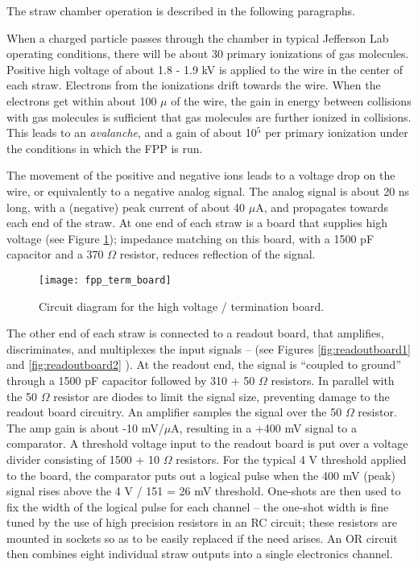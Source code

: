 The straw chamber operation is described in the following paragraphs.

When a charged particle passes through the chamber in typical Jefferson Lab
operating conditions, there will be about 30 primary ionizations of gas
molecules.
Positive high voltage of about 1.8 - 1.9 kV is applied to the wire in the
center of each straw.
Electrons from the ionizations drift towards the wire.
When the electrons get within about 100 $\mu$ of the wire, the gain in energy
between collisions with gas molecules is sufficient that gas molecules
are further ionized in collisions.
This leads to an {\it avalanche}, and a gain of about 
10$^5$ per primary ionization under the conditions in which the FPP is run.

The movement of the positive and negative ions leads to a voltage drop
on the wire, or equivalently to a negative analog signal.
The analog signal is about 20 ns long, with a (negative)
peak current of about 40 $\mu$A, and propagates towards each end of the straw.
At one end of each straw is a board that supplies high voltage
(see Figure \ref{fig:termboard});
impedance matching on this board, with a 1500 pF capacitor and a 370 $\Omega$
resistor, reduces reflection of the signal.

\begin{figure}[tbh]
\begin{center}
\texttt{[image: fpp\_term\_board]}
{\linespread{1.}
\caption[Detectors: FPP HV Termination Board]{Circuit diagram for the high voltage / termination board.}
\label{fig:termboard}}
\end{center}
\end{figure}

The other end of each straw is connected to a readout board, that amplifies,
discriminates, and multiplexes the input signals --
(see Figures \ref{fig:readoutboard1} and \ref{fig:readoutboard2} ).
At the readout end, the signal is ``coupled to ground'' through a 1500
pF capacitor followed by 310 $+$ 50 $\Omega$ resistors.
In parallel with the 50 $\Omega$ resistor are diodes to limit the
signal size, preventing damage to the readout board circuitry.
An amplifier samples the signal over the 50 $\Omega$ resistor.
The amp gain is about -10 mV/$\mu$A, resulting in a +400 mV signal
to a comparator.
A threshold voltage input to the readout board is put over a voltage divider
consisting of 1500 $+$ 10 $\Omega$ resistors.
For the typical 4 V threshold applied to the board, the comparator
puts out a logical pulse when the 400 mV (peak) signal rises above the
4 V / 151 = 26 mV threshold.
One-shots are then used to fix the width of the logical pulse for each channel
-- the one-shot width is fine tuned by the use of high precision resistors in
an RC circuit; these resistors are mounted in sockets so as to be easily
replaced if the need arises.
An OR circuit then combines eight individual straw outputs into a single
electronics channel.

